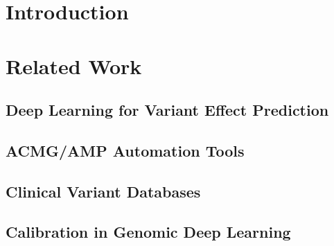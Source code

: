 \documentclass[10pt, conference, compsocconf]{IEEEtran}
\begin{document}
\section{Introduction}
\label{sec:intro}


\section{Related Work}
\label{sec:related}

\subsection{Deep Learning for Variant Effect Prediction}

\subsection{ACMG/AMP Automation Tools}

\subsection{Clinical Variant Databases}

\subsection{Calibration in Genomic Deep Learning}

\end{document}
